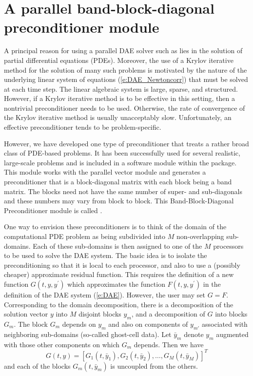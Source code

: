 \section{A parallel band-block-diagonal preconditioner module}\label{sss:idabbdpre}

A principal reason for using a parallel DAE solver such as {\ida} lies
in the solution of partial differential equations (PDEs).  Moreover,
the use of a Krylov iterative method for the solution of many such
problems is motivated by the nature of the underlying linear system of
equations (\ref{e:DAE_Newtoncorr}) that must be solved at each time step.  The
linear algebraic system is large, sparse, and structured. However, if
a Krylov iterative method is to be effective in this setting, then a
nontrivial preconditioner needs to be used.  Otherwise, the rate of
convergence of the Krylov iterative method is usually unacceptably
slow.  Unfortunately, an effective preconditioner tends to be
problem-specific.

However, we have developed one type of preconditioner that treats a
rather broad class of PDE-based problems.  It has been successfully
used for several realistic, large-scale problems \cite{HiTa:98} and is
included in a software module within the {\ida} package. This module
works with the parallel vector module {\nvecp} and 
generates a preconditioner that is a block-diagonal matrix with each
block being a band matrix. The blocks need not have the same number of
super- and sub-diagonals and these numbers may vary from block to
block. This Band-Block-Diagonal Preconditioner module is called
{\idabbdpre}.

One way to envision these preconditioners is to think of the domain of
the computational PDE problem as being subdivided into $M$ non-overlapping
sub-domains.  Each of these sub-domains is then assigned to one of the
$M$ processors to be used to solve the DAE system. The basic idea is
to isolate the preconditioning so that it is local to each processor,
and also to use a (possibly cheaper) approximate residual
function. This requires the definition of a new function $G(t,y,y^\prime)$
which approximates the function $F(t, y, y^\prime)$ in the definition of the DAE
system (\ref{e:DAE}). However, the user may set $G = F$.  Corresponding
to the domain decomposition, there is a decomposition of the solution
vector $y$ into $M$ disjoint blocks $y_m$, and a decomposition of $G$
into blocks $G_m$.  The block $G_m$ depends on $y_m$ and also on
components of $y_{m'}$ associated with neighboring sub-domains
(so-called ghost-cell data).  Let $\bar{y}_m$ denote $y_m$ augmented
with those other components on which $G_m$ depends.  Then we have
\begin{equation}
  G(t,y) = [G_1(t,\bar{y}_1), G_2(t,\bar{y}_2), \ldots, G_M(t,\bar{y}_M)]^T
\end{equation}
and each of the blocks $G_m(t, \bar{y}_m)$ is uncoupled from the others.

